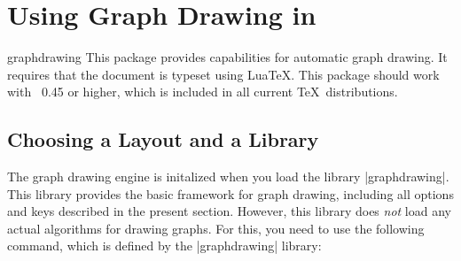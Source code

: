 %
%
%


\section{Using Graph Drawing in \tikzname}

{}

\begin{tikzlibrary}{graphdrawing}
  This package provides capabilities for automatic graph drawing. It
  requires that the document is typeset using Lua\TeX. This package
  should work with \LuaTeX\ 0.45 or higher, which is included in all
  current \TeX\ distributions. 
\end{tikzlibrary}


\subsection{Choosing a Layout and a Library}

The graph drawing engine is initalized when you load the library
|graphdrawing|. This library provides the basic framework for graph
drawing, including all options and keys described in the present
section. However, this library does \emph{not} load any actual
algorithms for drawing graphs. For this, you need to use the following
command, which is defined by the |graphdrawing| library:

